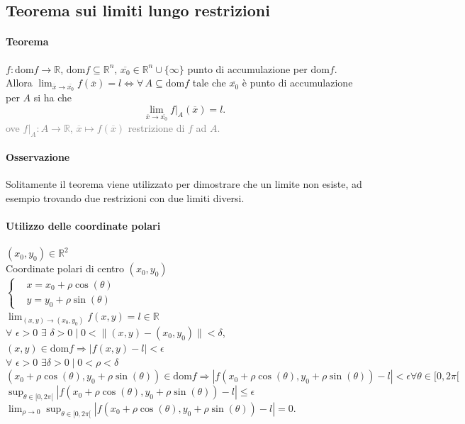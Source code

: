 \documentclass{article}
\newcommand{\R}{\mathbb{R}}
\newcommand{\dom}{\text{dom}}
\begin{document}
\subsection{{Teorema sui limiti lungo restrizioni}}
\paragraph{{Teorema}}
$f:\dom f\rightarrow\R$, $\dom f \subseteq\R^n$, $\overline{x_0}\in \R^n\cup\{\infty\}$ punto di accumulazione per $\dom f$. Allora $\lim_{\overline{x}\rightarrow\overline{x_0}}f(\overline{x})=l\Leftrightarrow \forall\,A \subseteq \dom f$ tale che $\overline{x_0}$ è punto di accumulazione per $A$ si ha che 
\begin{equation*}
    \lim_{\overline{x}\rightarrow\overline{x_0}}f|_A(\overline{x})=l.
\end{equation*}
\textcolor{grey}{ove $f|_A:A\rightarrow \R$, $\overline{x}\mapsto f(\overline{x})$ restrizione di $f$ ad $A$.}

\paragraph{{Osservazione}}
Solitamente il teorema viene utilizzato per dimostrare che un limite non esiste, ad esempio trovando due restrizioni con due limiti diversi.%

\paragraph{Utilizzo delle coordinate polari}
$(x_0,y_0)\in \R^2$\\
Coordinate polari di centro $(x_0,y_0)$\\
$\begin{cases}
    & x=x_0+\rho \cos(\theta)\\
    & y=y_0+\rho \sin(\theta)
\end{cases}$\\
$\lim_{(x,y)\rightarrow(x_0,y_0)}f(x,y)=l\in \R $\\
$\forall\,\, \epsilon >0 \,\, \exists \,\, \delta >0 \mid 0 < \|(x,y)-(x_0,y_0)\|< \delta$, $(x,y)\in \dom f \Rightarrow |f(x,y)-l|< \epsilon$\\
$ \forall \,\, \epsilon >0 \,\, \exists \delta >0 \mid 0<\rho < \delta$\\
$(x_0+\rho \cos(\theta), y_0+\rho \sin(\theta))\in \dom f \Rightarrow |f(x_0+\rho \cos(\theta), y_0+\rho \sin(\theta))-l|<\epsilon \forall\theta \in [0,2\pi[$\\
$\sup_{\theta \in [0,2\pi[}|f(x_0+\rho \cos(\theta), y_0+\rho \sin(\theta))-l|\leq\epsilon$\\
$\lim_{\rho\rightarrow0}\sup_{\theta \in [0,2\pi[}|f(x_0+\rho \cos(\theta), y_0+\rho \sin(\theta))-l|=0$.
\end{document}
